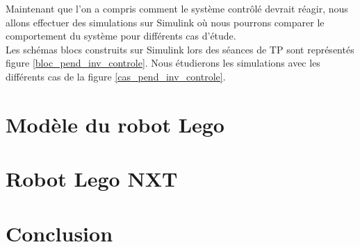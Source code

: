 \documentclass[11pt,french]{article} %
\begin{document}
Maintenant que l'on a compris comment le système contrôlé devrait réagir, nous allons effectuer des simulations sur Simulink où nous pourrons comparer le comportement du système pour différents cas d'étude. \\

Les schémas blocs construits sur Simulink lors des séances de TP sont représentés figure \ref{bloc_pend_inv_controle}. Nous étudierons les simulations avec les différents cas de la figure \ref{cas_pend_inv_controle}.\\








\newpage
\section{Modèle du robot Lego}

\newpage
\section{Robot Lego NXT}

\newpage
\section{Conclusion}
\end{document}
